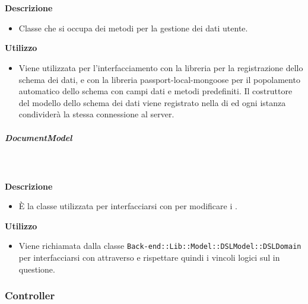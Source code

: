         \textbf{\\ \\ Descrizione} 
          \begin{itemize}
            \item[] Classe che si occupa dei metodi per la gestione dei dati utente. 
          \end{itemize}      
        \textbf{Utilizzo}  
          \begin{itemize}
            \item[] Viene utilizzata per l'interfacciamento con la libreria  per la registrazione dello schema dei dati, e con la libreria passport-local-mongoose per il popolamento automatico dello schema con campi dati e metodi predefiniti.
Il costruttore del modello dello schema dei dati viene registrato nella  di  ed ogni istanza condividerà la stessa connessione al server.
          \end{itemize}
      \subparagraph{DocumentModel}
        
        \textbf{\\ \\ Descrizione} 
          \begin{itemize}
            \item[] È la classe utilizzata per interfacciarsi con  per modificare i .
          \end{itemize}      
        \textbf{Utilizzo}  
          \begin{itemize}
            \item[] Viene richiamata dalla classe \texttt{Back-end::Lib::Model::DSLModel::DSLDomain} per interfacciarsi con  attraverso  e rispettare quindi i vincoli logici sul  in questione.
          \end{itemize}
  \subsubsection{Controller}
